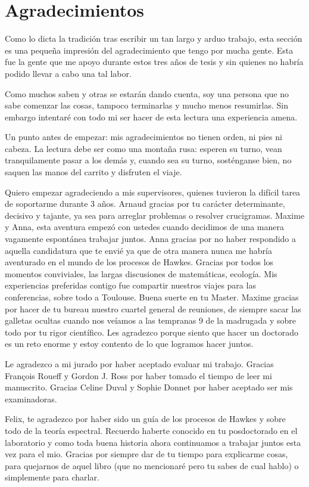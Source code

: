 \chapter{Agradecimientos}

Como lo dicta la tradición tras escribir un tan largo y arduo trabajo, esta sección es una pequeña impresión del agradecimiento que tengo por mucha gente. 
Esta fue la gente que me apoyo durante estos tres años de tesis y sin quienes no habría podido llevar a cabo una tal labor. 

Como muchos saben y otras se estarán dando cuenta, soy una persona que no sabe comenzar las cosas, tampoco terminarlas y mucho menos resumirlas. Sin embargo intentaré con todo mi ser hacer de esta lectura una experiencia amena.

Un punto antes de empezar: mis agradecimientos no tienen orden, ni pies ni cabeza. La lectura debe ser como una montaña rusa: esperen su turno, vean tranquilamente pasar a los demás y, cuando sea su turno, sosténganse bien, no saquen las manos del carrito y disfruten el viaje.


Quiero empezar agradeciendo a mis supervisores, quienes tuvieron la difícil tarea de soportarme durante 3 años. Arnaud gracias por tu carácter determinante, decisivo y tajante, ya sea para arreglar problemas o resolver crucigramas. Maxime y Anna, esta aventura empezó con ustedes cuando decidimos de una manera vagamente espontánea trabajar juntos. Anna gracias por no haber respondido a aquella candidatura que te envié ya que de otra manera nunca me habría aventurado en el mundo de los procesos de Hawkes. Gracias por todos los momentos conviviales, las largas discusiones de matemáticas, ecología. Mis experiencias preferidas contigo fue compartir nuestros viajes para las conferencias, sobre todo a Toulouse. Buena suerte en tu Master. Maxime gracias por hacer de tu bureau nuestro cuartel general de reuniones, de siempre sacar las galletas ocultas cuando nos veíamos a las tempranas 9 de la madrugada y sobre todo por tu rigor científico. Les agradezco porque siento que hacer un doctorado es un reto enorme y estoy contento de lo que logramos hacer juntos.

Le agradezco a mi jurado por haber aceptado evaluar mi trabajo. Gracias François Roueff y Gordon J. Ross por haber tomado el tiempo de leer mi manuscrito. Gracias Celine Duval y Sophie Donnet por haber aceptado ser mis examinadoras. 

Felix, te agradezco por haber sido un guía de los procesos de Hawkes y sobre todo de la teoría espectral. Recuerdo haberte conocido en tu posdoctorado en el laboratorio y como toda buena historia ahora continuamos a trabajar juntos esta vez para el mio. Gracias por siempre dar de tu tiempo para explicarme cosas, para quejarnos de aquel libro (que no mencionaré pero tu sabes de cual hablo) o simplemente para charlar.

